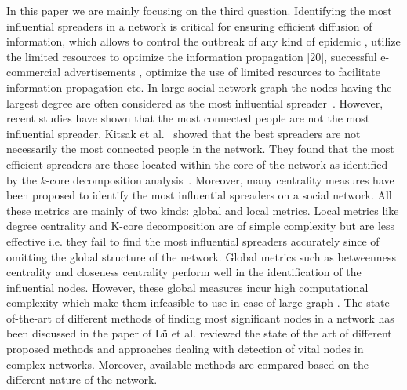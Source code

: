 \documentclass[sigconf]{acmart}
\begin{document}
In this paper we are mainly focusing on the third question. Identifying the most influential spreaders in a network is critical for ensuring efficient diffusion of information, which allows to control the outbreak of any kind of epidemic \cite{pastor2002immunization,PhysRevLett.91.247901}, utilize the limited resources to optimize the information propagation [20], successful e-commercial advertisements \cite{Leskovec:2007:DVM:1232722.1232727,lu2012recommender}, optimize the use of limited resources to facilitate information propagation \cite{chen2013information} etc. In large social network graph the nodes having the largest degree are often considered as the most influential spreader~\cite{pastor2001epidemic}. However, recent studies have shown that the most connected people are not the most influential spreader. Kitsak et al.~\cite{kitsak2010identification} showed that the best spreaders are not necessarily the most connected people in the network. They found that the most efficient spreaders are those located within the core of the network as identified by the $k$-core decomposition analysis~\cite{seidman1983network}. Moreover, many centrality measures have been proposed to identify the most influential spreaders on a social network. All these metrics are mainly of two kinds: global and local metrics. 
Local metrics like degree centrality and K-core decomposition are of simple complexity but are less effective i.e. they fail to find the most influential spreaders accurately since of omitting the global structure of the network. Global metrics such as betweenness centrality and closeness centrality perform well in the identification of the influential nodes. However, these global measures incur high computational complexity which make them infeasible to use in case of large graph \cite{Newman:2010:NI:1809753, fortunato2010community}. The state-of-the-art of different methods of finding most significant nodes in a network has been discussed in the paper of L\"u et al. \cite{lu2016vital} reviewed the state of the art of different proposed methods and approaches dealing with detection of vital nodes in complex networks. Moreover, available methods are compared based on the different nature of the network. 

\end{document}
